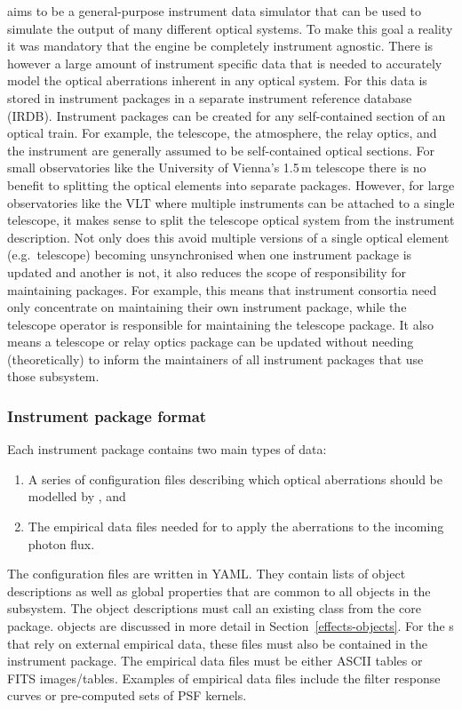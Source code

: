 \ScopeSim{} aims to be a general-purpose instrument data simulator that can be used to simulate the output of many different optical systems.
To make this goal a reality it was mandatory that the \scopesim{} engine be completely instrument agnostic.
There is however a large amount of instrument specific data that is needed to accurately model the optical aberrations inherent in any optical system.
For \ScopeSim{} this data is stored in instrument packages in a separate instrument reference database (IRDB).
Instrument packages can be created for any self-contained section of an optical train.
For example, the telescope, the atmosphere, the relay optics, and the instrument are generally assumed to be self-contained optical sections.
For small observatories like the University of Vienna's 1.5\,m telescope there is no benefit to splitting the optical elements into separate packages.
However, for large observatories like the VLT where multiple instruments can be attached to a single telescope, it makes sense to split the telescope optical system from the instrument description.
Not only does this avoid multiple versions of a single optical element (e.g.~telescope) becoming unsynchronised when one instrument package is updated and another is not, it also reduces the scope of responsibility for maintaining packages.
For example, this means that instrument consortia need only concentrate on maintaining their own instrument package, while the telescope operator is responsible for maintaining the telescope package.
It also means a telescope or relay optics package can be updated without needing (theoretically) to inform the maintainers of all instrument packages that use those subsystem.


\subsubsection{Instrument package format}
\label{instrument-package-format}

Each instrument package contains two main types of data:
\begin{enumerate}
\item A series of configuration files describing which optical aberrations should be modelled by \scopesim{}, and

\item The empirical data files needed for \scopesim{} to apply the aberrations to the incoming photon flux.
\end{enumerate}

The configuration files are written in YAML.
They contain lists of \Effect{} object descriptions as well as global properties that are common to all \Effect{} objects in the subsystem.
The \Effect{} object descriptions must call an existing \Effect{} class from the \ScopeSim{} core package.
\Effect{} objects are discussed in more detail in Section~\ref{effects-objects}.
For the \Effect{}s that rely on external empirical data, these files must also be contained in the instrument package.
The empirical data files must be either ASCII tables or FITS images/tables.
Examples of empirical data files include the filter response curves or pre-computed sets of PSF kernels.

